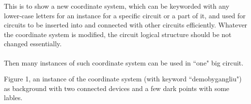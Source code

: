 \documentclass[tikz,border=5mm]{standalone}
\begin{document}
{\Huge This is to show a new coordinate system, which can be keyworded with any lower-case letters for an instance for a specific circuit or a part of it, and used for circuits to be inserted into and connected with other circuits efficiently. Whatever the coordinate system is modified, the circuit logical structure should be not changed essentially. 
\\
\\
Then many instances of such coordinate system can be used in ``one" big circuit.}

\newpage

\vspace{2cm}

{\Large Figure 1, an instance of the coordinate system (with keyword ``demobygangliu") as background with two connected devices and a few dark points with some lables.}
\end{document}

